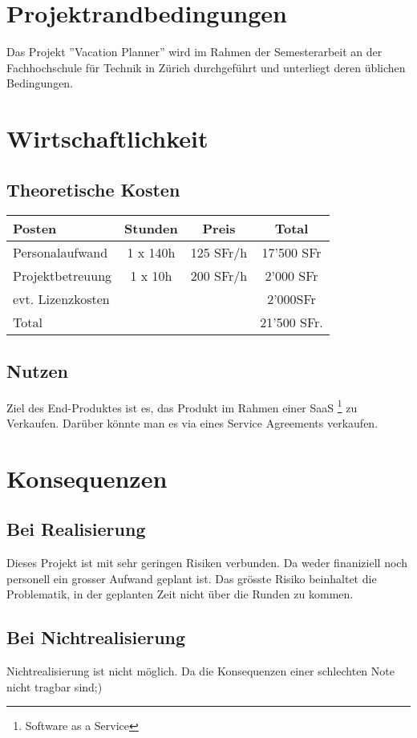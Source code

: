 \section{Projektrandbedingungen}
Das Projekt ''Vacation Planner'' wird im Rahmen der Semesterarbeit an der Fachhochschule f\"ur Technik in Z\"urich durchgef\"uhrt und unterliegt deren \"ublichen Bedingungen.

\section{Wirtschaftlichkeit}
\subsection{Theoretische Kosten}
\begin{tabular}[ht]{l|ccc}
  \hline
  Posten & Stunden & Preis & Total\\
  \hline
  Personalaufwand & 1 x 140h & 125 SFr/h &17'500 SFr \\
  Projektbetreuung & 1 x 10h & 200 SFr/h & 2'000 SFr \\
  evt. Lizenzkosten &  &  & 2'000SFr \\
  \hline
  Total & & & 21'500 SFr.\\
  \hline
\end{tabular}

\subsection{Nutzen}
Ziel des End-Produktes ist es, das Produkt im Rahmen einer SaaS \footnote{Software as a Service} zu Verkaufen. Dar\"uber k\"onnte man es via eines Service Agreements verkaufen.

\section{Konsequenzen}
\subsection{Bei Realisierung}
Dieses Projekt ist mit sehr geringen Risiken verbunden. Da weder finaniziell noch personell ein grosser Aufwand geplant ist. Das gr\"osste Risiko beinhaltet die Problematik, in der geplanten Zeit nicht \"uber die Runden zu kommen.

\subsection{Bei Nichtrealisierung}
Nichtrealisierung ist nicht m\"oglich. Da die Konsequenzen einer schlechten Note nicht tragbar sind;)

